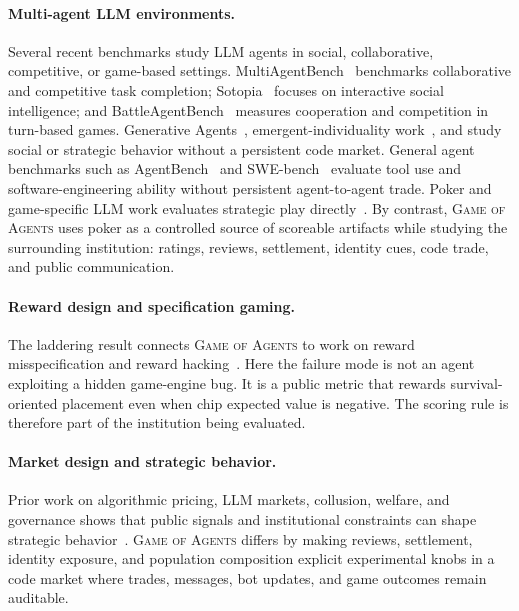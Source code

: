 \documentclass{article}
\newcommand{\goa}{\textsc{Game of Agents}}
\begin{document}
\paragraph{Multi-agent LLM environments.}
Several recent benchmarks study LLM agents in social, collaborative, competitive, or game-based settings.
MultiAgentBench~\citep{zhu2025multiagentbench} benchmarks collaborative and competitive task completion; Sotopia~\citep{zhou2024sotopia} focuses on interactive social intelligence; and BattleAgentBench~\citep{wang2024battleagentbench} measures cooperation and competition in turn-based games.
Generative Agents~\citep{park2023generative}, emergent-individuality work~\citep{takata2024spontaneous}, and \citet{sreedhar2024simulating} study social or strategic behavior without a persistent code market.
General agent benchmarks such as AgentBench~\citep{liu2023agentbench} and SWE-bench~\citep{jimenez2023swebench} evaluate tool use and software-engineering ability without persistent agent-to-agent trade.
Poker and game-specific LLM work evaluates strategic play directly~\citep{hu2024pokellmon, qin2025loki, zhuang2025pokerbench, pokerbattle2025}.
By contrast, \goa{} uses poker as a controlled source of scoreable artifacts while studying the surrounding institution: ratings, reviews, settlement, identity cues, code trade, and public communication.

\paragraph{Reward design and specification gaming.}
The laddering result connects \goa{} to work on reward misspecification and reward hacking~\citep{skalse2022defining, denison2024sycophancy, pan2024feedback, metr2025reward}.
Here the failure mode is not an agent exploiting a hidden game-engine bug.
It is a public metric that rewards survival-oriented placement even when chip expected value is negative.
The scoring rule is therefore part of the institution being evaluated.

\paragraph{Market design and strategic behavior.}
Prior work on algorithmic pricing, LLM markets, collusion, welfare, and governance shows that public signals and institutional constraints can shape strategic behavior~\citep{musolff2022algorithmic, lin2024strategic, demarzo2025ai, fish2024algorithmic, xie2026m3bench, syrnikov2026institutional, nakamura2026colosseum, rose2026narcbench}.
\goa{} differs by making reviews, settlement, identity exposure, and population composition explicit experimental knobs in a code market where trades, messages, bot updates, and game outcomes remain auditable.
\end{document}
